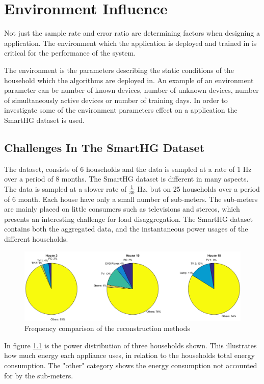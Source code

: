 \chapter{Environment Influence } 
\label{sec:EnvInf}
Not just the sample rate and error ratio are determining factors when designing a  application. The environment which the application is deployed and trained in is critical for the performance of the system. 

The environment is the parameters describing the static conditions of the household which the algorithms are deployed in. An example of an environment parameter can be number of known devices, number of unknown devices, number of simultaneously active devices or number of training days. In order to investigate some of the environment parameters effect on a  application the SmartHG dataset is used. 

\section{Challenges In The SmartHG Dataset} 
The  dataset, consists of 6 households and the data is sampled at a rate of 1 Hz over a period of 8 months. The SmartHG dataset is different in many aspects. The data is sampled at a slower rate of $\frac{1}{30}$ Hz, but on 25 households over a period of 6 month. Each house have only a small number of sub-meters. The sub-meters are mainly placed on little consumers such as televisions and stereos, which presents an interesting challenge for load disaggregation. The SmartHG dataset contains both the aggregated data, and the instantaneous power usages of the different households.

\begin{figure}[H]
\centering
\includegraphics[width=1\textwidth]{billeder/TotalPie.png}
\caption{Frequency comparison of the reconstruction methods}
\label{fig:SLC}
\end{figure}

In figure \ref{fig:SLC} is the power distribution of three households shown. This illustrates how much energy each appliance uses, in relation to the households total energy consumption. The "other" category shows the energy consumption not accounted for by the sub-meters.  

